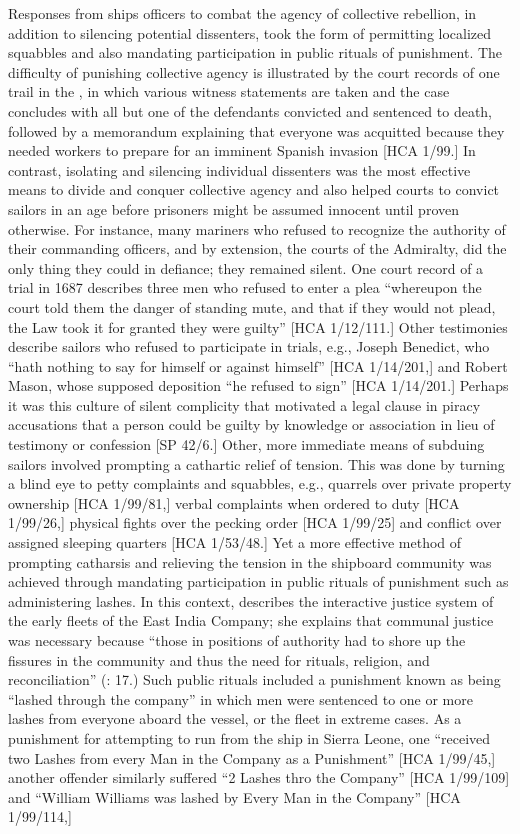 Responses from ships officers to combat the agency of collective rebellion, in addition to silencing potential dissenters, took the form of permitting localized squabbles and also mandating participation in public rituals of punishment. The difficulty of punishing collective agency is illustrated by the court records of one trail in the  \citealt{Islands1722}, in which various witness statements are taken and the case concludes with all but one of the defendants convicted and sentenced to death, followed by a memorandum explaining that everyone was acquitted because they needed workers to prepare for an imminent Spanish invasion [HCA 1/99.] In contrast, isolating and silencing individual dissenters was the most effective means to divide and conquer collective agency and also helped courts to convict sailors in an age before prisoners might be assumed innocent until proven otherwise. For instance, many mariners who refused to recognize the authority of their commanding officers, and by extension, the courts of the Admiralty, did the only thing they could in defiance; they remained silent. One court record of a trial in 1687 describes three men who refused to enter a plea “whereupon the court told them the danger of standing mute, and that if they would not plead, the Law took it for granted they were guilty” [HCA 1/12/111.] Other testimonies describe sailors who refused to participate in trials, e.g., Joseph Benedict, who “hath nothing to say for himself or against himself” [HCA 1/14/201,] and Robert Mason, whose supposed deposition “he refused to sign” [HCA 1/14/201.] Perhaps it was this culture of silent complicity that motivated a legal clause in piracy accusations that a person could be guilty by knowledge or association in lieu of testimony or confession [SP 42/6.] Other, more immediate means of subduing sailors involved prompting a cathartic relief of tension. This was done by turning a blind eye to petty complaints and squabbles, e.g., quarrels over private property ownership [HCA 1/99/81,] verbal complaints when ordered to duty [HCA 1/99/26,] physical fights over the pecking order [HCA 1/99/25] and conflict over assigned sleeping quarters [HCA 1/53/48.] Yet a more effective method of prompting catharsis and relieving the tension in the shipboard community was achieved through mandating participation in public rituals of punishment such as administering lashes. In this context, \citet{Fury2015} describes the interactive justice system of the early   fleets of the East India Company; she explains that communal justice was necessary because “those in positions of authority had to shore up the fissures in the community and thus the need for rituals, religion, and reconciliation” (\citealt{Fury2015}: 17.) Such public rituals included a punishment known as being “lashed through the company” in which men were sentenced to one or more lashes from everyone aboard the vessel, or the fleet in extreme cases. As a punishment for attempting to run from the ship in Sierra Leone, one  “received two Lashes from every Man in the Company as a Punishment” [HCA 1/99/45,] another offender similarly suffered “2 Lashes thro the Company” [HCA 1/99/109] and “William Williams was lashed by Every Man in the Company” [HCA 1/99/114,] 